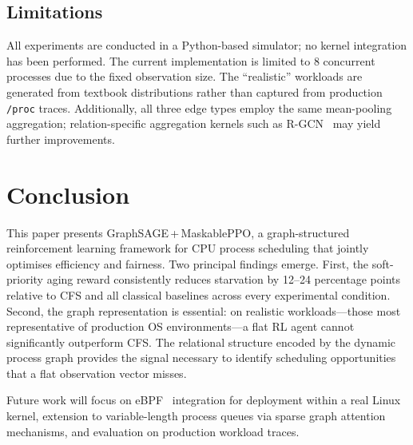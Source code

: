 \documentclass[conference]{IEEEtran}
\newcommand{\method}{GraphSAGE\,+\,MaskablePPO}
\begin{document}
\subsection{Limitations}

All experiments are conducted in a Python-based simulator; no kernel
integration has been performed.  The current implementation is limited
to 8 concurrent processes due to the fixed observation size.  The
``realistic'' workloads are generated from textbook distributions rather
than captured from production \texttt{/proc} traces.  Additionally, all
three edge types employ the same mean-pooling aggregation;
relation-specific aggregation kernels such as
R-GCN~\cite{rgcn} may yield further improvements.

\section{Conclusion}
\label{sec:conclusion}

This paper presents \method{}, a graph-structured reinforcement learning
framework for CPU process scheduling that jointly optimises efficiency
and fairness.  Two principal findings emerge.  First, the soft-priority
aging reward consistently reduces starvation by 12--24 percentage points
relative to CFS and all classical baselines across every experimental
condition.  Second, the graph representation is essential: on realistic
workloads---those most representative of production OS
environments---a flat RL agent cannot significantly outperform CFS.  The
relational structure encoded by the dynamic process graph provides the
signal necessary to identify scheduling opportunities that a flat
observation vector misses.

Future work will focus on eBPF~\cite{ebpf} integration for deployment
within a real Linux kernel, extension to variable-length process queues
via sparse graph attention mechanisms, and evaluation on production
workload traces.



\end{document}
